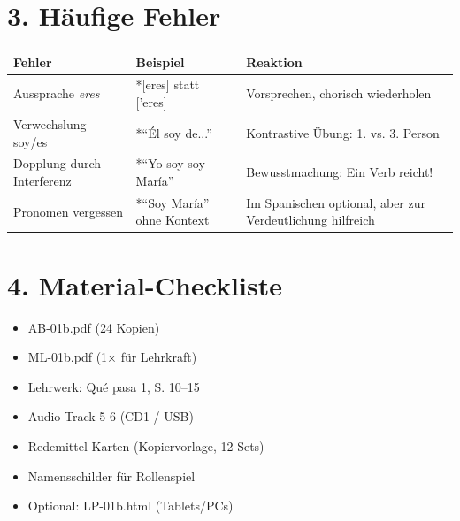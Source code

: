 \documentclass[11pt, a4paper]{article}
\begin{document}
\section*{3. Häufige Fehler}

\begin{fehlerbox}
\begin{tabularx}{\textwidth}{|l|X|X|}
\hline
\textbf{Fehler} & \textbf{Beispiel} & \textbf{Reaktion} \\
\hline
Aussprache \textit{eres} & *[eres] statt ['eres] & Vorsprechen, chorisch wiederholen \\
\hline
Verwechslung soy/es & *``Él soy de...'' & Kontrastive Übung: 1. vs. 3. Person \\
\hline
Dopplung durch Interferenz & *``Yo soy soy María'' & Bewusstmachung: Ein Verb reicht! \\
\hline
Pronomen vergessen & *``Soy María'' ohne Kontext & Im Spanischen optional, aber zur Verdeutlichung hilfreich \\
\hline
\end{tabularx}
\end{fehlerbox}


\section*{4. Material-Checkliste}

\begin{materialbox}
\begin{itemize}[label=$\square$]
    \item AB-01b.pdf (24 Kopien)
    \item ML-01b.pdf (1× für Lehrkraft)
    \item Lehrwerk: Qué pasa 1, S. 10--15
    \item Audio Track 5-6 (CD1 / USB)
    \item Redemittel-Karten (Kopiervorlage, 12 Sets)
    \item Namensschilder für Rollenspiel
    \item Optional: LP-01b.html (Tablets/PCs)
\end{itemize}
\end{materialbox}

\end{document}
